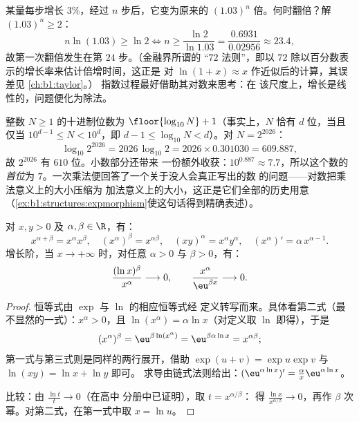 \begin{example}[倍增时间]\label{ex:b1:functions:doubling}
某量每步增长 $3\%$，经过 $n$ 步后，它变为原来的
$(1.03)^n$ 倍。何时翻倍？解 $(1.03)^n
\geq 2$：
\[
n\ln(1.03) \geq \ln2
\iff n \geq \frac{\ln 2}{\ln 1.03}
= \frac{0.6931}{0.02956} \approx 23.4 ,
\]
故第一次翻倍发生在第 $24$ 步。（金融界所谓的
“$72$ 法则”，即以
$72$ 除以百分数表示的增长率来估计倍增时间，这正是
对 $\ln(1 + x) \approx x$ 作近似后的计算，其误差见
\cref{ch:b1:taylor}。）
指数过程最好借助其对数来思考：在
该尺度上，增长是线性的，问题便化为除法。
\end{example}

\begin{example}[$2^{2026}$ 有几位？]\label{ex:b1:functions:digits}
整数 $N \geq 1$ 的十进制位数为
$\floor{\log_{10} N} + 1$（事实上，$N$ 恰有 $d$ 位，当且仅当
$10^{d-1} \leq N < 10^d$，即 $d - 1 \leq \log_{10}N < d$）。对
$N = 2^{2026}$：
\[
\log_{10} 2^{2026} = 2026\,\log_{10}2
= 2026 \times 0.301030 = 609.887 ,
\]
故 $2^{2026}$ 有 $610$ 位。小数部分还带来
一份额外收获：$10^{0.887} \approx 7.7$，所以这个数的\emph{首位}为
$7$。一次乘法便回答了一个关于没人会真正写出的数
的问题——对数把乘法意义上的大小压缩为
加法意义上的大小，这正是它们全部的历史用意
（\cref{ex:b1:structures:expmorphism}使这句话得到精确表述）。
\end{example}

\begin{proposition}[幂的运算法则与增长比较]\label{prop:b1:functions:powerrules}
对 $x, y > 0$ 及 $\alpha, \beta \in \R$，有：
\[
x^{\alpha+\beta} = x^\alpha x^\beta, \quad
(x^\alpha)^\beta = x^{\alpha\beta}, \quad
(xy)^\alpha = x^\alpha y^\alpha, \quad
(x^\alpha)' = \alpha\, x^{\alpha - 1}.
\]
增长阶，当 $x \to +\infty$ 时，对任意
$\alpha > 0$ 与 $\beta > 0$，有：
\[
\frac{(\ln x)^\beta}{x^\alpha} \longrightarrow 0,
\qquad
\frac{x^\alpha}{\eu^{\beta x}} \longrightarrow 0 .
\]
\end{proposition}

\begin{proof}
恒等式由 $\exp$ 与 $\ln$ 的相应恒等式经
定义转写而来。具体看第二式（最不显然的一式）：$x^\alpha
> 0$，且 $\ln(x^\alpha) = \alpha\ln x$（对定义取
$\ln$ 即得），于是
\[
(x^\alpha)^\beta = \eu^{\beta\ln(x^\alpha)}
= \eu^{\beta\alpha\ln x} = x^{\alpha\beta} ;
\]
第一式与第三式则是同样的两行展开，借助
$\exp(u + v) = \exp u\exp v$ 与 $\ln(xy) = \ln x + \ln y$ 即可。
求导由链式法则给出：$(\eu^{\alpha\ln x})' =
\frac{\alpha}{x} \eu^{\alpha\ln x}$。

比较：由 $\frac{\ln t}{t} \to 0$（在高中
分册中已证明），取 $t = x^{\alpha/\beta}$：
得 $\frac{\ln x}{x^{\alpha/\beta}} \to 0$，再作
$\beta$ 次幂。对第二式，在第一式中取 $x = \ln u$。
\end{proof}

